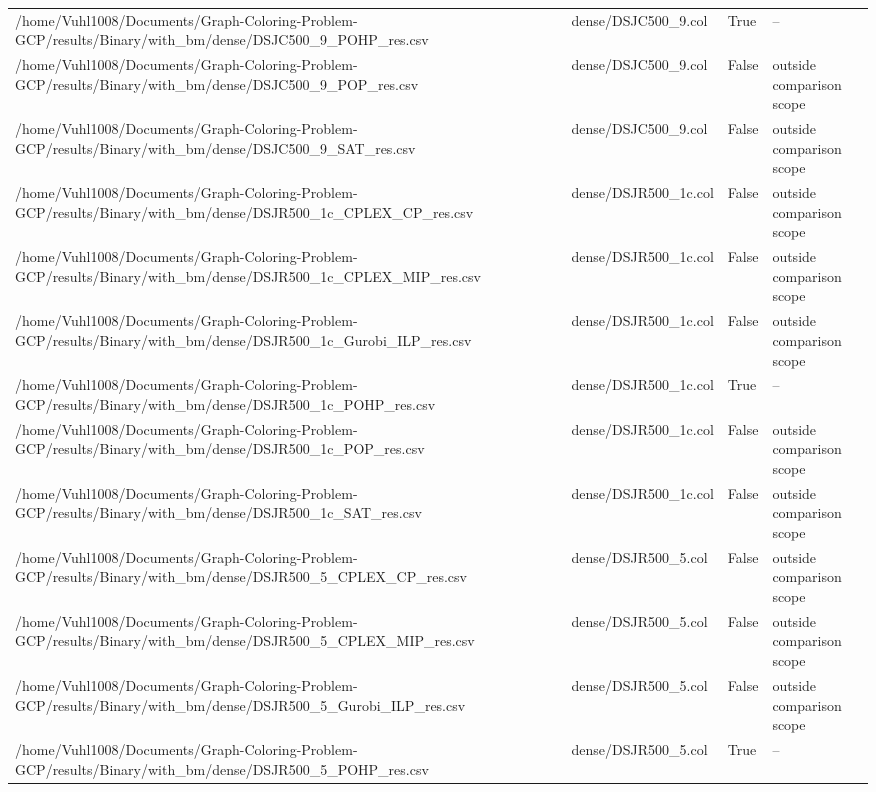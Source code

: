 \begin{table}[htbp]
\begin{tabular}{llll}
/home/Vuhl1008/Documents/Graph-Coloring-Problem-GCP/results/Binary/with\_bm/dense/DSJC500\_9\_POHP\_res.csv & dense/DSJC500\_9.col & True & -- \\
/home/Vuhl1008/Documents/Graph-Coloring-Problem-GCP/results/Binary/with\_bm/dense/DSJC500\_9\_POP\_res.csv & dense/DSJC500\_9.col & False & outside comparison scope \\
/home/Vuhl1008/Documents/Graph-Coloring-Problem-GCP/results/Binary/with\_bm/dense/DSJC500\_9\_SAT\_res.csv & dense/DSJC500\_9.col & False & outside comparison scope \\
/home/Vuhl1008/Documents/Graph-Coloring-Problem-GCP/results/Binary/with\_bm/dense/DSJR500\_1c\_CPLEX\_CP\_res.csv & dense/DSJR500\_1c.col & False & outside comparison scope \\
/home/Vuhl1008/Documents/Graph-Coloring-Problem-GCP/results/Binary/with\_bm/dense/DSJR500\_1c\_CPLEX\_MIP\_res.csv & dense/DSJR500\_1c.col & False & outside comparison scope \\
/home/Vuhl1008/Documents/Graph-Coloring-Problem-GCP/results/Binary/with\_bm/dense/DSJR500\_1c\_Gurobi\_ILP\_res.csv & dense/DSJR500\_1c.col & False & outside comparison scope \\
/home/Vuhl1008/Documents/Graph-Coloring-Problem-GCP/results/Binary/with\_bm/dense/DSJR500\_1c\_POHP\_res.csv & dense/DSJR500\_1c.col & True & -- \\
/home/Vuhl1008/Documents/Graph-Coloring-Problem-GCP/results/Binary/with\_bm/dense/DSJR500\_1c\_POP\_res.csv & dense/DSJR500\_1c.col & False & outside comparison scope \\
/home/Vuhl1008/Documents/Graph-Coloring-Problem-GCP/results/Binary/with\_bm/dense/DSJR500\_1c\_SAT\_res.csv & dense/DSJR500\_1c.col & False & outside comparison scope \\
/home/Vuhl1008/Documents/Graph-Coloring-Problem-GCP/results/Binary/with\_bm/dense/DSJR500\_5\_CPLEX\_CP\_res.csv & dense/DSJR500\_5.col & False & outside comparison scope \\
/home/Vuhl1008/Documents/Graph-Coloring-Problem-GCP/results/Binary/with\_bm/dense/DSJR500\_5\_CPLEX\_MIP\_res.csv & dense/DSJR500\_5.col & False & outside comparison scope \\
/home/Vuhl1008/Documents/Graph-Coloring-Problem-GCP/results/Binary/with\_bm/dense/DSJR500\_5\_Gurobi\_ILP\_res.csv & dense/DSJR500\_5.col & False & outside comparison scope \\
/home/Vuhl1008/Documents/Graph-Coloring-Problem-GCP/results/Binary/with\_bm/dense/DSJR500\_5\_POHP\_res.csv & dense/DSJR500\_5.col & True & -- \\

\end{tabular}
\end{table}
